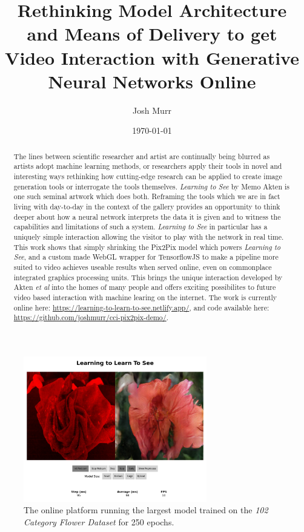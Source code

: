 \documentclass{article}
\title{\vspace{-4em}Rethinking Model Architecture and Means of Delivery to get Video Interaction with Generative Neural Networks Online}
\date{\today}
\author{Josh Murr}
\begin{document}
\maketitle

\begin{abstract}
	The lines between scientific researcher and artist are continually being blurred as artists adopt machine learning methods\cite{anna_ridler}, or researchers apply their tools in novel and interesting ways\cite{deep_dream_guy} rethinking how cutting-edge research can be applied to create image generation tools or interrogate the tools themselves. \textit{Learning to See} by Memo Akten\cite{lts_memo} is one such seminal artwork which does both. Reframing the tools which we are in fact living with day-to-day in the context of the gallery provides an opportunity to think deeper about how a neural network interprets the data it is given and to witness the capabilities and limitations of such a system. \textit{Learning to See} in particular has a uniquely simple interaction allowing the visitor to play with the network in real time. This work shows that simply shrinking the Pix2Pix\cite{1611.07004} model which powers \textit{Learning to See}, and a custom made WebGL wrapper for TensorflowJS to make a pipeline more suited to video achieves useable results when served online, even on commonplace integrated graphics processing units. This brings the unique interaction developed by Akten \textit{et al}\cite{2003.00902} into the homes of many people and offers exciting possibilites to future video based interaction with machine learing on the internet. The work is currently online here: \url{https://learning-to-learn-to-see.netlify.app/}, and code available here: \url{https://github.com/joshmurr/cci-pix2pix-demo/}.
\end{abstract}

\begin{figure}[h!]
	\centering
	\includegraphics[width=8cm]{ltlts_online2}
	\caption{The online platform running the largest model trained on the \textit{102 Category Flower Dataset}\cite{flowers_dataset} for 250 epochs.}
\end{figure}
\end{document}
